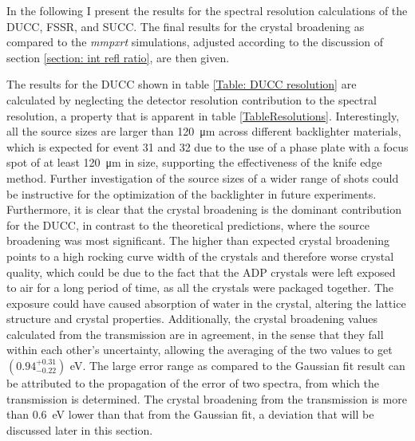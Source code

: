 In the following I present the results for the spectral resolution calculations of the DUCC, FSSR, and SUCC. The final results for the crystal broadening as compared to the \textit{mmpxrt} simulations, adjusted according to the discussion of section \ref{section: int refl ratio}, are then given. 

The results for the DUCC shown in table \ref{Table: DUCC resolution} are calculated by neglecting the detector resolution contribution to the spectral resolution, a property that is apparent in table \ref{TableResolutions}. Interestingly, all the source sizes are larger than \SI{120}{\micro\meter} across different backlighter materials, which is expected for event 31 and 32 due to the use of a phase plate with a focus spot of at least \SI{120}{\micro\meter} in size, supporting the effectiveness of the knife edge method. Further investigation of the source sizes of a wider range of shots could be instructive for the optimization of the backlighter in future experiments. Furthermore, it is clear that the crystal broadening is the dominant contribution for the DUCC, in contrast to the theoretical predictions, where the source broadening was most significant. The higher than expected crystal broadening points to a high rocking curve width of the crystals and therefore worse crystal quality, which could be due to the fact that the ADP crystals were left exposed to air for a long period of time, as all the crystals were packaged together. The exposure could have caused absorption of water in the crystal, altering the lattice structure and crystal properties. Additionally, the crystal broadening values calculated from the transmission are in agreement, in the sense that they fall within each other's uncertainty, allowing the averaging of the two values to get $\left(0.94^{+0.31}_{-0.22}\right)$ eV. The large error range as compared to the Gaussian fit result can be attributed to the propagation of the error of two spectra, from which the transmission is determined. The crystal broadening from the transmission is more than \SI{0.6}{\electronvolt} lower than that from the Gaussian fit, a deviation that will be discussed later in this section. 

